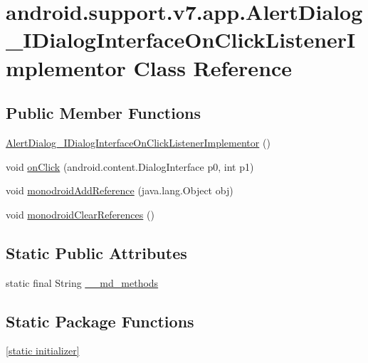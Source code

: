 \hypertarget{classandroid_1_1support_1_1v7_1_1app_1_1_alert_dialog___i_dialog_interface_on_click_listener_implementor}{
\section{android.support.v7.app.AlertDialog\_\-IDialogInterfaceOnClickListenerImplementor Class Reference}
\label{classandroid_1_1support_1_1v7_1_1app_1_1_alert_dialog___i_dialog_interface_on_click_listener_implementor}
}
\subsection*{Public Member Functions}
\begin{CompactItemize}
\item 
\hyperlink{classandroid_1_1support_1_1v7_1_1app_1_1_alert_dialog___i_dialog_interface_on_click_listener_implementor_4977a2096c2ca6fada156713257a3052}{AlertDialog\_\-IDialogInterfaceOnClickListenerImplementor} ()
\item 
void \hyperlink{classandroid_1_1support_1_1v7_1_1app_1_1_alert_dialog___i_dialog_interface_on_click_listener_implementor_8e35c027fd2de981ed97054edd6cb86f}{onClick} (android.content.DialogInterface p0, int p1)
\item 
void \hyperlink{classandroid_1_1support_1_1v7_1_1app_1_1_alert_dialog___i_dialog_interface_on_click_listener_implementor_7625377f1befd57755de35ba74a4fb9f}{monodroidAddReference} (java.lang.Object obj)
\item 
void \hyperlink{classandroid_1_1support_1_1v7_1_1app_1_1_alert_dialog___i_dialog_interface_on_click_listener_implementor_b97868ba78e36937f05c4e816bb3cb5b}{monodroidClearReferences} ()
\end{CompactItemize}
\subsection*{Static Public Attributes}
\begin{CompactItemize}
\item 
static final String \hyperlink{classandroid_1_1support_1_1v7_1_1app_1_1_alert_dialog___i_dialog_interface_on_click_listener_implementor_7aee9cb7287752446ffc15a0c438412c}{\_\-\_\-md\_\-methods}
\end{CompactItemize}
\subsection*{Static Package Functions}
\begin{CompactItemize}
\item 
\hyperlink{classandroid_1_1support_1_1v7_1_1app_1_1_alert_dialog___i_dialog_interface_on_click_listener_implementor_24cc6a7c6c76a3d447deca53e35c3790}{\mbox{[}static initializer\mbox{]}}
\end{CompactItemize}
